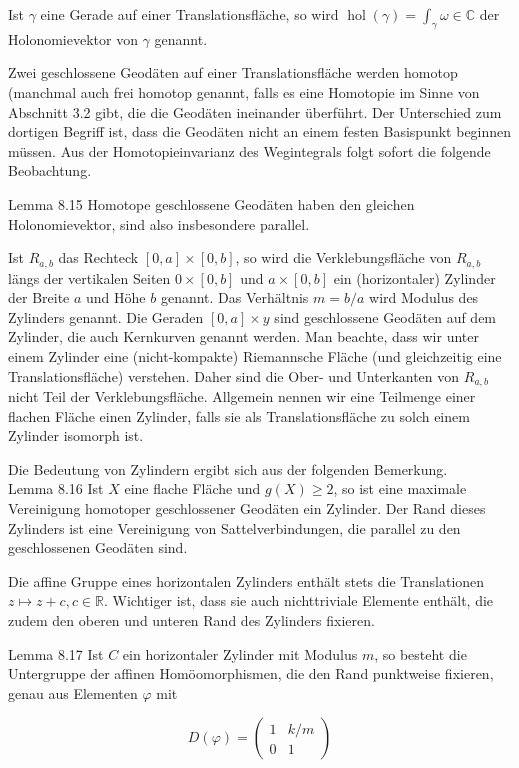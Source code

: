 \documentclass[10pt, letterpaper]{article}
\begin{document}
Ist $\gamma$ eine Gerade auf einer Translationsfläche, so wird $\operatorname{hol}(\gamma)=\int_{\gamma} \omega \in \mathbb{C}$ der Holonomievektor von $\gamma$ genannt.

Zwei geschlossene Geodäten auf einer Translationsfläche werden homotop (manchmal auch frei homotop genannt, falls es eine Homotopie im Sinne von Abschnitt 3.2 gibt, die die Geodäten ineinander überführt. Der Unterschied zum dortigen Begriff ist, dass die Geodäten nicht an einem festen Basispunkt beginnen müssen. Aus der Homotopieinvarianz des Wegintegrals folgt sofort die folgende Beobachtung.

Lemma 8.15 Homotope geschlossene Geodäten haben den gleichen Holonomievektor, sind also insbesondere parallel.

Ist $R_{a, b}$ das Rechteck $[0, a] \times[0, b]$, so wird die Verklebungsfläche von $R_{a, b}$ längs der vertikalen Seiten $0 \times[0, b]$ und $a \times[0, b]$ ein (horizontaler) Zylinder der Breite $a$ und Höhe $b$ genannt. Das Verhältnis $m=b / a$ wird Modulus des Zylinders genannt. Die Geraden $[0, a] \times y$ sind geschlossene Geodäten auf dem Zylinder, die auch Kernkurven genannt werden. Man beachte, dass wir unter einem Zylinder eine (nicht-kompakte) Riemannsche Fläche (und gleichzeitig eine Translationsfläche) verstehen. Daher sind die Ober- und Unterkanten von $R_{a, b}$ nicht Teil der Verklebungsfläche. Allgemein nennen wir eine Teilmenge einer flachen Fläche einen Zylinder, falls sie als Translationsfläche zu solch einem Zylinder isomorph ist.

Die Bedeutung von Zylindern ergibt sich aus der folgenden Bemerkung.\\
Lemma 8.16 Ist $X$ eine flache Fläche und $g(X) \geq 2$, so ist eine maximale Vereinigung homotoper geschlossener Geodäten ein Zylinder. Der Rand dieses Zylinders ist eine Vereinigung von Sattelverbindungen, die parallel zu den geschlossenen Geodäten sind.

Die affine Gruppe eines horizontalen Zylinders enthält stets die Translationen $z \mapsto z+c, c \in \mathbb{R}$. Wichtiger ist, dass sie auch nichttriviale Elemente enthält, die zudem den oberen und unteren Rand des Zylinders fixieren.

Lemma 8.17 Ist $C$ ein horizontaler Zylinder mit Modulus $m$, so besteht die Untergruppe der affinen Homöomorphismen, die den Rand punktweise fixieren, genau aus Elementen $\varphi$ mit

$$
D(\varphi)=\left(\begin{array}{cc}
1 & k / m \\
0 & 1
\end{array}\right)
$$
\end{document}
